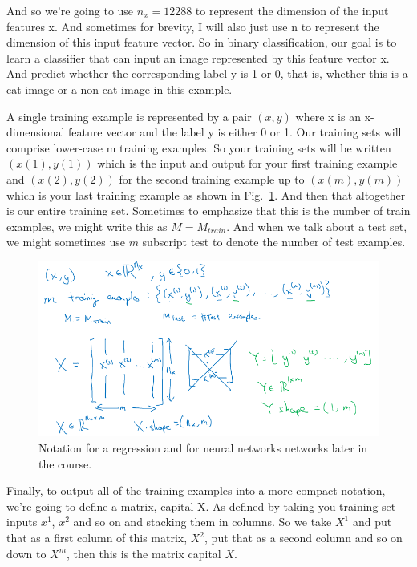 \documentclass[a4paper]{article}
\begin{document}
And so we're going to use $n_x=12288$ to represent the dimension of the input features x. And sometimes for brevity, I will also just use n to represent the dimension of this input feature vector. So in binary classification, our goal is to learn a classifier that can input an image represented by this feature vector x. And predict whether the corresponding label y is 1 or 0, that is, whether this is a cat image or a non-cat image in this example.

A single training example is represented by a pair $(x,y)$ where x is an x-dimensional feature vector and the label y is either 0 or 1. Our training sets will comprise lower-case m training examples. So your training sets will be written $(x(1), y(1))$ which is the input and output for your first training example and $(x(2), y(2))$ for the second training example up to $(x(m), y(m))$ which is your last training example as shown in Fig.~\ref{p2}. And then that altogether is our entire training set. Sometimes to emphasize that this is the number of train examples, we might write this as $M = M_{train}$. And when we talk about a test set, we might sometimes use $m$ subscript test to denote the number of test examples.
\begin{figure}
	\begin{center}
		\includegraphics[scale=0.4]{figures/3.png}
	\end{center}
	\caption{Notation for a regression and for neural networks networks later in the course.}
	\label{p2}
\end{figure}
Finally, to output all of the training examples into a more compact notation, we're going to define a matrix, capital X. As defined by taking you training set inputs $x^1$, $x^2$ and so on and stacking them in columns. So we take $X^1$ and put that as a first column of this matrix, $X^2$, put that as a second column and so on down to $X^m$, then this is the matrix capital $X$.
\end{document}
